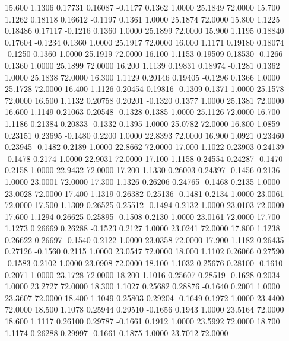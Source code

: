   15.600   1.1306   0.17731   0.16087  -0.1177   0.1362   1.0000  25.1849  72.0000
  15.700   1.1262   0.18118   0.16612  -0.1197   0.1361   1.0000  25.1874  72.0000
  15.800   1.1225   0.18486   0.17117  -0.1216   0.1360   1.0000  25.1899  72.0000
  15.900   1.1195   0.18840   0.17604  -0.1234   0.1360   1.0000  25.1917  72.0000
  16.000   1.1171   0.19180   0.18074  -0.1250   0.1360   1.0000  25.1919  72.0000
  16.100   1.1153   0.19509   0.18530  -0.1266   0.1360   1.0000  25.1899  72.0000
  16.200   1.1139   0.19831   0.18974  -0.1281   0.1362   1.0000  25.1838  72.0000
  16.300   1.1129   0.20146   0.19405  -0.1296   0.1366   1.0000  25.1728  72.0000
  16.400   1.1126   0.20454   0.19816  -0.1309   0.1371   1.0000  25.1578  72.0000
  16.500   1.1132   0.20758   0.20201  -0.1320   0.1377   1.0000  25.1381  72.0000
  16.600   1.1149   0.21063   0.20548  -0.1328   0.1385   1.0000  25.1126  72.0000
  16.700   1.1186   0.21384   0.20833  -0.1332   0.1395   1.0000  25.0782  72.0000
  16.800   1.0859   0.23151   0.23695  -0.1480   0.2200   1.0000  22.8393  72.0000
  16.900   1.0921   0.23460   0.23945  -0.1482   0.2189   1.0000  22.8662  72.0000
  17.000   1.1022   0.23903   0.24139  -0.1478   0.2174   1.0000  22.9031  72.0000
  17.100   1.1158   0.24554   0.24287  -0.1470   0.2158   1.0000  22.9432  72.0000
  17.200   1.1330   0.26003   0.24397  -0.1456   0.2136   1.0000  23.0001  72.0000
  17.300   1.1326   0.26206   0.24765  -0.1468   0.2135   1.0000  23.0028  72.0000
  17.400   1.1319   0.26382   0.25136  -0.1481   0.2134   1.0000  23.0061  72.0000
  17.500   1.1309   0.26525   0.25512  -0.1494   0.2132   1.0000  23.0103  72.0000
  17.600   1.1294   0.26625   0.25895  -0.1508   0.2130   1.0000  23.0161  72.0000
  17.700   1.1273   0.26669   0.26288  -0.1523   0.2127   1.0000  23.0241  72.0000
  17.800   1.1238   0.26622   0.26697  -0.1540   0.2122   1.0000  23.0358  72.0000
  17.900   1.1182   0.26435   0.27126  -0.1560   0.2115   1.0000  23.0547  72.0000
  18.000   1.1102   0.26066   0.27590  -0.1583   0.2102   1.0000  23.0908  72.0000
  18.100   1.1032   0.25676   0.28100  -0.1610   0.2071   1.0000  23.1728  72.0000
  18.200   1.1016   0.25607   0.28519  -0.1628   0.2034   1.0000  23.2727  72.0000
  18.300   1.1027   0.25682   0.28876  -0.1640   0.2001   1.0000  23.3607  72.0000
  18.400   1.1049   0.25803   0.29204  -0.1649   0.1972   1.0000  23.4400  72.0000
  18.500   1.1078   0.25944   0.29510  -0.1656   0.1943   1.0000  23.5164  72.0000
  18.600   1.1117   0.26100   0.29787  -0.1661   0.1912   1.0000  23.5992  72.0000
  18.700   1.1174   0.26288   0.29997  -0.1661   0.1875   1.0000  23.7012  72.0000
